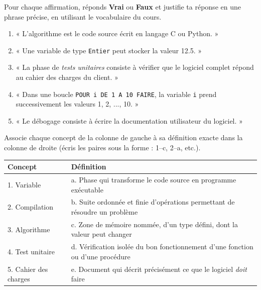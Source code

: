 \documentclass[11pt]{article}
\begin{document}
\begin{exercice}
Pour chaque affirmation, réponds \textbf{Vrai} ou \textbf{Faux} et justifie ta réponse en une phrase précise, en utilisant le vocabulaire du cours.

\begin{enumerate}
    \item « L'algorithme est le code source écrit en langage C ou Python. »
    \item « Une variable de type \texttt{Entier} peut stocker la valeur \num{12,5}. »
    \item « La phase de \emph{tests unitaires} consiste à vérifier que le logiciel complet répond au cahier des charges du client. »
    \item « Dans une boucle \texttt{POUR i DE 1 A 10 FAIRE}, la variable \texttt{i} prend successivement les valeurs 1, 2, ..., 10. »
    \item « Le débogage consiste à écrire la documentation utilisateur du logiciel. »
\end{enumerate}
\end{exercice}

\begin{exercice}
Associe chaque concept de la colonne de gauche à sa définition exacte dans la colonne de droite (écris les paires sous la forme : 1--c, 2--a, etc.).

\begin{center}
\begin{tabularx}{\linewidth}{|l|X|}
\hline
\rowcolor{popblueL}\textbf{Concept} & \textbf{Définition} \\
\hline
1. Variable & a. Phase qui transforme le code source en programme exécutable \\
\hline
2. Compilation & b. Suite ordonnée et finie d'opérations permettant de résoudre un problème \\
\hline
3. Algorithme & c. Zone de mémoire nommée, d'un type défini, dont la valeur peut changer \\
\hline
4. Test unitaire & d. Vérification isolée du bon fonctionnement d'une fonction ou d'une procédure \\
\hline
5. Cahier des charges & e. Document qui décrit précisément ce que le logiciel \emph{doit} faire \\
\hline
\end{tabularx}
\end{center}
\end{exercice}
\end{document}
